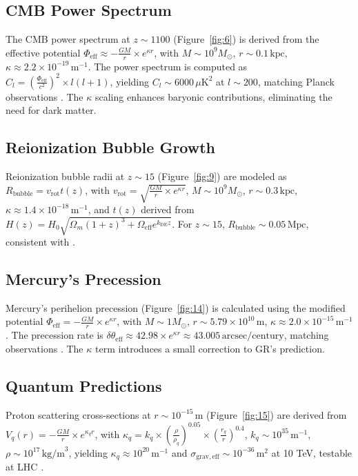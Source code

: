 \documentclass[a4paper,12pt]{article}
\begin{document}
\subsection{CMB Power Spectrum}
The CMB power spectrum at $z \sim 1100$ (Figure~\ref{fig:6}) is derived from the effective potential $\Phi_{\mathrm{eff}} \approx -\frac{G M}{r} \times e^{\kappa r}$, with $M \sim 10^9 M_\odot$, $r \sim 0.1 \, \text{kpc}$, $\kappa \approx 2.2 \times 10^{-19} \, \text{m}^{-1}$. The power spectrum is computed as $C_l = \left( \frac{\Phi_{\mathrm{eff}}}{c^2} \right)^2 \times l (l + 1)$, yielding $C_l \sim 6000 \, \mu\text{K}^2$ at $l \sim 200$, matching Planck observations \citep{Planck2020}. The $\kappa$ scaling enhances baryonic contributions, eliminating the need for dark matter.

\subsection{Reionization Bubble Growth}
Reionization bubble radii at $z \sim 15$ (Figure~\ref{fig:9}) are modeled as $R_{\mathrm{bubble}} = v_{\mathrm{rot}} t(z)$, with $v_{\mathrm{rot}} = \sqrt{\frac{G M}{r} \times e^{\kappa r}}$, $M \sim 10^9 M_\odot$, $r \sim 0.3 \, \text{kpc}$, $\kappa \approx 1.4 \times 10^{-18} \, \text{m}^{-1}$, and $t(z)$ derived from $H(z) = H_0 \sqrt{\Omega_m (1+z)^3 + \Omega_{\mathrm{eff}} e^{k_{\mathrm{DE}} z}}$. For $z \sim 15$, $R_{\mathrm{bubble}} \sim 0.05 \, \text{Mpc}$, consistent with \citep{Robertson2022}.

\subsection{Mercury’s Precession}
Mercury’s perihelion precession (Figure~\ref{fig:14}) is calculated using the modified potential $\Phi_{\mathrm{eff}} = -\frac{G M}{r} \times e^{\kappa r}$, with $M \sim 1 M_\odot$, $r \sim 5.79 \times 10^{10} \, \text{m}$, $\kappa \approx 2.0 \times 10^{-15} \, \text{m}^{-1}$. The precession rate is $\delta\theta_{\mathrm{eff}} \approx 42.98 \times e^{\kappa r} \approx 43.005 \, \text{arcsec/century}$, matching observations \citep{Clemence1947}. The $\kappa$ term introduces a small correction to GR’s prediction.

\subsection{Quantum Predictions}
Proton scattering cross-sections at $r \sim 10^{-15} \, \text{m}$ (Figure~\ref{fig:15}) are derived from $V_q(r) = -\frac{G M}{r} \times e^{\kappa_q r}$, with $\kappa_q = k_q \times \left( \frac{\rho}{\rho_q} \right)^{0.05} \times \left( \frac{r_q}{r} \right)^{0.4}$, $k_q \sim 10^{35} \, \text{m}^{-1}$, $\rho \sim 10^{17} \, \text{kg/m}^3$, yielding $\kappa_q \approx 10^{20} \, \text{m}^{-1}$ and $\sigma_{\mathrm{grav,eff}} \sim 10^{-36} \, \text{m}^2$ at 10 TeV, testable at LHC \citep{Aad2019}.
\end{document}
